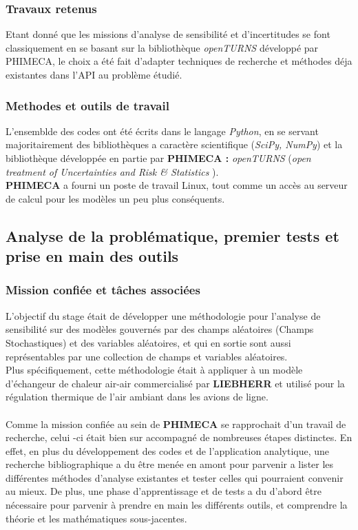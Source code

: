 \documentclass[a4paper,10pt]{article}
\begin{document}
\subsubsection{Travaux retenus}
Etant donné que les missions d'analyse de sensibilité et d'incertitudes se font classiquement en se basant sur la bibliothèque \textit{openTURNS} développé par PHIMECA, le choix a été fait d'adapter techniques de recherche et méthodes déja existantes dans l'API au problème étudié. 


\subsubsection{Methodes et outils de travail}
L'ensemblde des codes ont été écrits dans le langage \textit{Python}, en se servant majoritairement des bibliothèques a caractère scientifique (\textit{SciPy, NumPy}) et la bibliothèque développée en partie par \textbf{PHIMECA :} \textit{openTURNS} (\emph{open treatment of Uncertainties and Risk \& Statistics })\cite{OpenTURNS}.\\
\textbf{PHIMECA} a fourni un poste de travail Linux, tout comme un accès au serveur de calcul pour les modèles un peu plus conséquents. \\

\subsection{Analyse de la problématique, premier tests et prise en main des outils}

\subsubsection{Mission confiée et tâches associées}
L'objectif du stage était de développer une méthodologie pour l'analyse de sensibilité sur des modèles gouvernés par des champs aléatoires (Champs Stochastiques) et des variables aléatoires, et qui en sortie sont aussi représentables par une collection de champs et variables aléatoires. \\
Plus spécifiquement, cette méthodologie était à appliquer à un modèle d'échangeur de chaleur air-air commercialisé par \textbf{LIEBHERR} et utilisé pour la régulation thermique de l'air ambiant dans les avions de ligne.\\\\
Comme la mission confiée au sein de \textbf{PHIMECA} se rapprochait d'un travail de recherche, celui -ci était bien sur accompagné de nombreuses étapes distinctes. En effet, en plus du développement des codes et de l'application analytique, une recherche bibliographique a du être menée en amont pour parvenir a lister les différentes méthodes d'analyse existantes et tester celles qui pourraient convenir au mieux. De plus, une phase d'apprentissage et de tests a du d'abord être nécessaire pour parvenir à prendre en main les différents outils, et comprendre la théorie et les mathématiques sous-jacentes.\\
\end{document}
